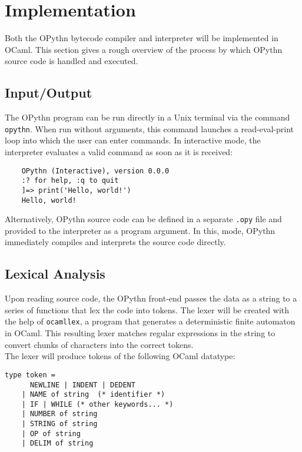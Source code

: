 \documentclass[11pt, twoside]{article}
\begin{document}
\section{Implementation}
Both the OPythn bytecode compiler and interpreter will be implemented in OCaml. This section gives a rough overview of the process by which OPythn source code is handled and executed.
    \subsection{Input/Output}
    The OPythn program can be run directly in a Unix terminal via the command \texttt{opythn}. When run without arguments, this command launches a read-eval-print loop into which the user can enter commands. In interactive mode, the interpreter evaluates a valid command as soon as it is received:
    \begin{lstlisting}
    OPythn (Interactive), version 0.0.0
    :? for help, :q to quit
    ]=> print('Hello, world!')
    Hello, world!
    \end{lstlisting}
    Alternatively, OPythn source code can be defined in a separate \texttt{.opy} file and provided to the interpreter as a program argument. In this, mode, OPythn immediately compiles and interprets the source code directly.
    \subsection{Lexical Analysis}
    Upon reading source code, the OPythn front-end passes the data as a string to a series of functions that lex the code into tokens. The lexer will be created with the help of \texttt{ocamllex}, a program that generates a deterministic finite automaton in OCaml. This resulting lexer matches regular expressions in the string to convert chunks of characters into the correct tokens.\\
    \indent The lexer will produce tokens of the following OCaml datatype:
    \begin{lstlisting}[language=caml]
    type token =
      NEWLINE | INDENT | DEDENT
    | NAME of string  (* identifier *)
    | IF | WHILE (* other keywords... *)
    | NUMBER of string
    | STRING of string
    | OP of string
    | DELIM of string
    \end{lstlisting}
\end{document}
